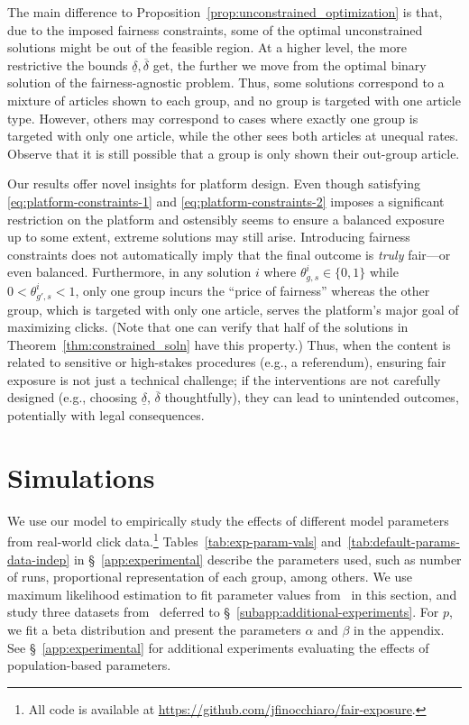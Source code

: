 \documentclass[letterpaper]{article} %
\begin{document}
The main difference to Proposition~\ref{prop:unconstrained_optimization} is that, due to the imposed fairness constraints, some of the optimal unconstrained solutions might be out of the feasible region.
%
At a higher level, the more restrictive the bounds $\underline{\delta}, \overline{\delta}$ get, the further we move from the optimal binary solution of the fairness-agnostic problem.
%
Thus, some solutions correspond to a mixture of articles shown to each group, and no group is targeted with one article type.
%
However, others may correspond to cases where exactly one group is targeted with only one article, while the other sees both articles at unequal rates. 
%
Observe that it is still possible that a group is only shown their out-group article.

Our results offer novel insights for platform design. 
%
Even though satisfying \eqref{eq:platform-constraints-1} and \eqref{eq:platform-constraints-2} imposes a significant restriction on the platform and ostensibly seems to ensure a balanced exposure up to some extent, extreme solutions may still arise.
%
Introducing fairness constraints does not automatically imply that the final outcome is \textit{truly} fair---or even balanced.
%
Furthermore, in any solution $i$ where $\theta_{g,s}^i \in \{0,1\}$ while $0<\theta_{g',s}^i<1$, only one group incurs the ``price of fairness'' whereas the other group, which is targeted with only one article, serves the platform's major goal of maximizing clicks.
%
(Note that one can verify that half of the solutions in Theorem~\ref{thm:constrained_soln} have this property.)
%
Thus, when the content is related to sensitive or high-stakes procedures (e.g., a referendum), ensuring fair exposure is not just a technical challenge; if the interventions are not carefully designed (e.g., choosing $\underline{\delta}$, $\overline{\delta}$ thoughtfully), they can lead to unintended outcomes, potentially with legal consequences. 

\section{Simulations}\label{sec:simulations}

We use our model to empirically study the effects of different model parameters from real-world click data.\footnote{All code is available at \url{https://github.com/jfinocchiaro/fair-exposure}.}
%
Tables~\ref{tab:exp-param-vals} and~\ref{tab:default-params-data-indep} in \S~\ref{app:experimental} describe the parameters used, such as number of runs, proportional representation of each group, among others.
%
We use maximum likelihood estimation to fit parameter values from~\citet{ReplicationExposure} in this section, and study three datasets from~\citet{balancedExposure} deferred to \S~\ref{subapp:additional-experiments}.
%
For $p$, we fit a beta distribution and present the parameters $\alpha$ and $\beta$ in the appendix.
See \S~\ref{app:experimental} for additional experiments evaluating the effects of population-based parameters.
\end{document}
